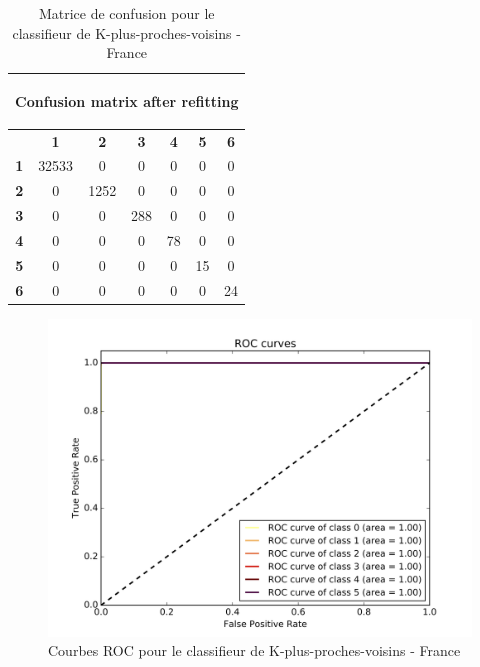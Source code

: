 \documentclass{book}
\begin{document}
\begin{table}[H]
  \begin{center}
  \begin{adjustbox}{max width=\textwidth}
  \begin{tabular}{|c|c|c|c|c|c|c|}
    \hline
    \multicolumn{7}{|c|}{{ \begin{bf}Confusion matrix after refitting\end{bf}}} \\
    \hline
     & \textbf{1} & \textbf{2} & \textbf{3} & \textbf{4} & \textbf{5} & \textbf{6}\\
    \hline
    \textbf{1} & 32533 & 0 & 0 & 0 & 0 & 0\\
    \hline
    \textbf{2} & 0 & 1252 & 0 & 0 & 0 & 0\\
    \hline
    \textbf{3} & 0 & 0 & 288 & 0 & 0 & 0\\
    \hline
    \textbf{4} & 0 & 0 & 0 & 78 & 0 & 0\\
    \hline
    \textbf{5} & 0 & 0 & 0 & 0 & 15 & 0\\
    \hline
    \textbf{6} & 0 & 0 & 0 & 0 & 0 & 24\\
    \hline
  \end{tabular}
  \end{adjustbox}
  \end{center}
  \caption{Matrice de confusion pour le classifieur de K-plus-proches-voisins - France}
  \label{knn_cm}
\end{table}

\begin{figure}[H]
 \begin{center}
\includegraphics[scale=0.4]{../../data/France/test/Nearest_Neighboors_Classification/Nearest_Neighboors_Classification_roc.png}
 \end{center}
 \caption{Courbes ROC pour le classifieur de K-plus-proches-voisins - France}
 \label{knn_roc}
\end{figure}
\end{document}
